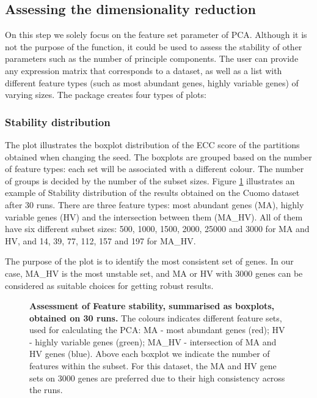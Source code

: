 \subsection{Assessing the dimensionality reduction}
On this step we solely focus on the feature set parameter of PCA. Although it is not the purpose of the function, it could be used to assess the stability of other parameters such as the number of principle components. The user can provide any expression matrix that corresponds to a dataset, as well as a list with different feature types (such as most abundant genes, highly variable genes) of varying sizes. The package creates four types of plots:

\subsubsection{Stability distribution}
The plot illustrates the boxplot distribution of the ECC score of the partitions obtained when changing the seed. The boxplots are grouped based on the number of feature types: each set will be associated with a different colour. The number of groups is decided by the number of the subset sizes. Figure \ref{fig:ca-feat-inc} illustrates an example of Stability distribution of the results obtained on the Cuomo dataset after 30 runs. There are three feature types: most abundant genes (MA), highly variable genes (HV) and the intersection between them (MA\_HV). All of them have six different subset sizes: 500, 1000, 1500, 2000, 25000 and 3000 for MA and HV, and 14, 39, 77, 112, 157 and 197 for MA\_HV. 

The purpose of the plot is to identify the most consistent set of genes. In our case, MA\_HV is the most unstable set, and MA or HV with 3000 genes can be considered as suitable choices for getting robust results.
\begin{figure}[H]
    \centering
    \caption{\label{fig:ca-feat-inc} \textbf{Assessment of Feature stability, summarised as boxplots, obtained on 30 runs.} The colours indicates different feature sets, used for calculating the PCA: MA - most abundant genes (red); HV - highly variable genes (green); MA\_HV - intersection of MA and HV genes (blue). Above each boxplot we indicate the number of features within the subset. For this dataset, the MA and HV gene sets on 3000 genes are preferred due to their high consistency across the runs.}
\end{figure}

